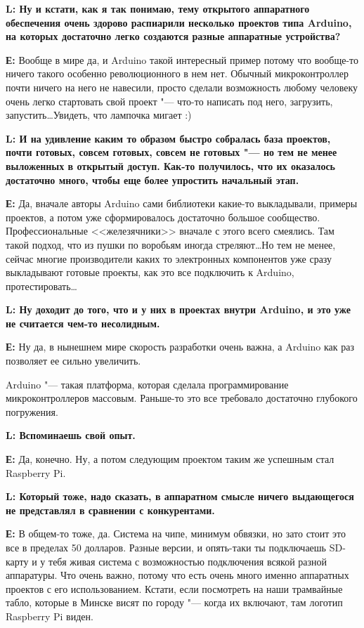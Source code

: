 \documentclass[10pt, a5paper]{article}
\begin{document}
{\noindent \bf L: Ну и кстати, как я так понимаю, тему открытого аппаратного обеспечения очень здорово распиарили несколько проектов типа Arduino, на которых достаточно легко  создаются разные аппаратные устройства?}

{\noindent \bf Е:} Вообще в мире да, и Arduino такой интересный пример потому что вообще-то ничего такого особенно революционного в нем нет. Обычный микроконтроллер почти ничего на него не навесили, просто сделали возможность любому человеку очень легко стартовать свой проект "--- что-то написать под него, загрузить, запустить\ldots Увидеть, что лампочка мигает :)

{\noindent \bf L: И на удивление каким то образом быстро собралась база проектов, почти готовых, совсем готовых, совсем не готовых "--- но тем не менее выложенных в открытый доступ. Как-то получилось, что их оказалось достаточно много, чтобы еще более упростить начальный этап.}

{\noindent \bf Е:} Да, вначале авторы Arduino сами библиотеки какие-то выкладывали, примеры проектов, а потом уже сформировалось достаточно большое сообщество. Профессиональные <<железячники>> вначале с этого всего смеялись. Там такой подход, что из пушки по воробьям иногда стреляют\ldots Но тем не менее, сейчас многие производители каких то электронных компонентов уже сразу выкладывают готовые проекты, как это все подключить к Arduino, протестировать\ldots


{\noindent \bf L: Ну доходит до того, что и у них в проектах внутри Arduino, и это уже не считается чем-то несолидным.}

{\noindent \bf Е:} Ну да, в нынешнем мире скорость разработки очень важна, а Arduino как раз позволяет ее сильно увеличить.

Arduino "--- такая платформа, которая сделала программирование микроконтроллеров массовым. Раньше-то это все требовало достаточно  глубокого погружения.

{\noindent \bf L: Вспоминаешь свой опыт.}

{\noindent \bf Е:} Да, конечно. Ну, а потом следующим проектом таким же успешным стал Raspberry Pi. 


{\noindent \bf L: Который тоже, надо сказать, в аппаратном смысле ничего выдающегося не представлял в сравнении с конкурентами.}

{\noindent \bf Е:} В общем-то тоже, да. Система на чипе, минимум обвязки, но зато стоит это все в пределах 50 долларов. Разные версии, и опять-таки ты подключаешь SD-карту и у тебя живая система с возможностью подключения всякой разной аппаратуры.  Что очень важно, потому что есть очень много именно аппаратных проектов с его использованием. Кстати, если посмотреть на наши трамвайные табло, которые в Минске висят по городу "--- когда их включают, там логотип Raspberry Pi виден.
\end{document}
